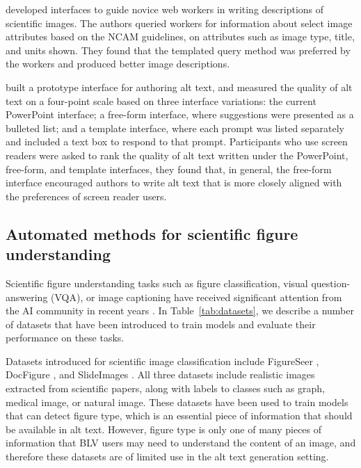 \documentclass[sigconf]{acmart}
\begin{document}
\citet{Morash2015GuidingNW} developed interfaces to guide novice web workers in writing descriptions of scientific images. The authors queried workers for information about select image attributes based on the NCAM guidelines, on attributes such as image type, title, and units shown. They found that the templated query method was preferred by the workers and produced better image descriptions.

\citet{Mack2021DesigningTF} built a prototype interface for authoring alt text, and measured the quality of alt text on a four-point scale based on three interface variations: the current PowerPoint interface; a free-form interface, where suggestions were presented as a bulleted list; and a template interface, where each prompt was listed separately and included a text box to respond to that prompt. Participants who use screen readers were asked to rank the quality of alt text written under the PowerPoint, free-form, and template interfaces, they found that, in general, the free-form interface encouraged authors to write alt text that is more closely aligned with the preferences of screen reader users. 

\subsection{Automated methods for scientific figure understanding}
\label{sec:rw_figure_understanding}

Scientific figure understanding tasks such as figure classification, visual question-answering (VQA), or image captioning have received significant attention from the AI community in recent years \citep{Siegel2016FigureSeerPR, Jobin2019DocFigureAD, Morris2020SlideImagesAD, Kahou2018FigureQAAA, Kafle2018DVQAUD, Methani2020PlotQARO, Levy2021ClassificationRegressionFC, Chen2019NeuralCG, Chen2019FigureCW, Hsu2021SciCapGC, Nicolson2021AEHRCCA, Qian2021GeneratingAC}. In Table~\ref{tab:datasets}, we describe a number of datasets that have been introduced to train models and evaluate their performance on these tasks.  


Datasets introduced for scientific image classification include FigureSeer \citep{Siegel2016FigureSeerPR}, DocFigure \citep{Jobin2019DocFigureAD}, and SlideImages \citep{Morris2020SlideImagesAD}. All three datasets include realistic images extracted from scientific papers, along with labels to classes such as graph, medical image, or natural image. These datasets have been used to train models that can detect figure type, which is an essential piece of information that should be available in alt text. However, figure type is only one of many pieces of information that BLV users may need to understand the content of an image, and therefore these datasets are of limited use in the alt text generation setting.
\end{document}
